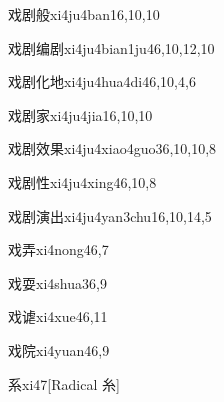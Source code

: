 \begin{entry}{戏剧般}{xi4ju4ban1}{6,10,10}
\end{entry}

\begin{entry}{戏剧编剧}{xi4ju4bian1ju4}{6,10,12,10}
\end{entry}

\begin{entry}{戏剧化地}{xi4ju4hua4di4}{6,10,4,6}
\end{entry}

\begin{entry}{戏剧家}{xi4ju4jia1}{6,10,10}
\end{entry}

\begin{entry}{戏剧效果}{xi4ju4xiao4guo3}{6,10,10,8}
\end{entry}

\begin{entry}{戏剧性}{xi4ju4xing4}{6,10,8}
\end{entry}

\begin{entry}{戏剧演出}{xi4ju4yan3chu1}{6,10,14,5}
\end{entry}

\begin{entry}{戏弄}{xi4nong4}{6,7}
\end{entry}

\begin{entry}{戏耍}{xi4shua3}{6,9}
\end{entry}

\begin{entry}{戏谑}{xi4xue4}{6,11}
\end{entry}

\begin{entry}{戏院}{xi4yuan4}{6,9}
\end{entry}

\begin{entry}{系}{xi4}{7}[Radical 糸]
\end{entry}

